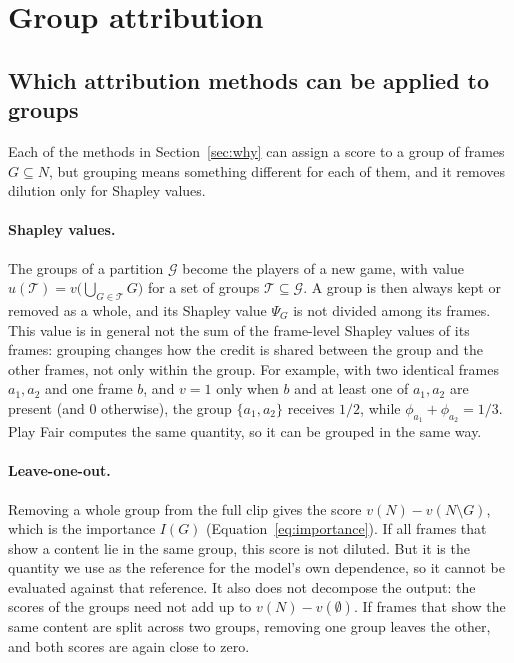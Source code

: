 \section{Group attribution}
\label{sec:groups}



\subsection{Which attribution methods can be applied to groups}
\label{sec:which-groups}

Each of the methods in Section~\ref{sec:why} can assign a score to a group of frames $G \subseteq N$, but grouping means something different for each of them, and it removes dilution only for Shapley values.

\paragraph{Shapley values.}
The groups of a partition $\mathcal{G}$ become the players of a new game, with value $u(\mathcal{T}) = v\bigl(\bigcup_{G \in \mathcal{T}} G\bigr)$ for a set of groups $\mathcal{T} \subseteq \mathcal{G}$.
A group is then always kept or removed as a whole, and its Shapley value $\Psi_G$ is not divided among its frames.
This value is in general not the sum of the frame-level Shapley values of its frames: grouping changes how the credit is shared between the group and the other frames, not only within the group.
For example, with two identical frames $a_1, a_2$ and one frame $b$, and $v = 1$ only when $b$ and at least one of $a_1, a_2$ are present (and $0$ otherwise), the group $\{a_1, a_2\}$ receives $1/2$, while $\phi_{a_1} + \phi_{a_2} = 1/3$.
Play Fair computes the same quantity, so it can be grouped in the same way.

\paragraph{Leave-one-out.}
Removing a whole group from the full clip gives the score $v(N) - v(N \setminus G)$, which is the importance $I(G)$ (Equation~\ref{eq:importance}).
If all frames that show a content lie in the same group, this score is not diluted.
But it is the quantity we use as the reference for the model's own dependence, so it cannot be evaluated against that reference.
It also does not decompose the output: the scores of the groups need not add up to $v(N) - v(\emptyset)$.
If frames that show the same content are split across two groups, removing one group leaves the other, and both scores are again close to zero.

